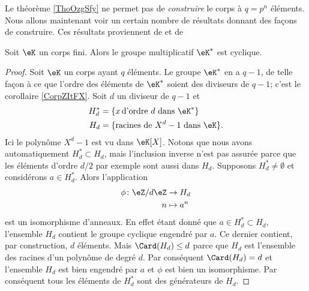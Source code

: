 Le théorème \ref{ThoOzgSfy} ne permet pas de \emph{construire} le corps à \( q=p^n\) éléments. Nous allons maintenant voir un certain nombre de résultats donnant des façons de construire. Ces résultats proviennent de \cite{MichelMerlecorpsfinis,GabrielPeyre,RodierCorpsFinis} et de  

\begin{proposition}     \label{PropnfebjI}
    Soit \( \eK\) un corps fini. Alors le groupe multiplicatif \( \eK^*\) est cyclique.
\end{proposition}

\begin{proof}
    Soit \( \eK\) un corps ayant \( q\) éléments. Le groupe \( \eK^*\) en a \( q-1\), de telle façon à ce que l'ordre des éléments de \( \eK^*\) soient des diviseurs de \( q-1\); c'est le corollaire \ref{CorpZItFX}. Soit \( d\) un diviseur de \( q-1\) et
    \begin{subequations}
        \begin{align}
            H^*_d&=\{ x\,\text{d'ordre \( d\) dans \( \eK^*\)} \}\\
            H_d&=\{ \text{racines de \( X^d-1\) dans \( \eK\)} \}.
        \end{align}
    \end{subequations}
    Ici le polynôme \( X^d-1\) est vu dans \( \eK[X]\). Notons que nous avons automatiquement \( H^*_d\subset H_d\), mais l'inclusion inverse n'est pas assurée parce que les éléments d'ordre \( d/2\) par exemple sont aussi dans \( H_d\). Supposons \( H^*_d\neq \emptyset\) et considérons \( a\in H^*_d\). Alors l'application
    \begin{equation}
        \begin{aligned}
            \phi\colon \eZ/d\eZ&\to H_d \\
            n&\mapsto a^n 
        \end{aligned}
    \end{equation}
    est un isomorphisme d'anneaux. En effet étant donné que \( a\in H^*_d\subset H_d\), l'ensemble \( H_d\) contient le groupe cyclique engendré par \( a\). Ce dernier contient, par construction, \( d\) éléments. Mais \( \Card(H_d)\leq d\) parce que \( H_d\) est l'ensemble des racines d'un polynôme de degré \( d\). Par conséquent \( \Card(H_d)=d\) et l'ensemble \( H_d\) est bien engendré par \( a\) et \( \phi\) est bien un isomorphisme. Par conséquent tous les éléments de \( H^*_d\) sont des générateurs de \( H_d\).


\end{proof}
